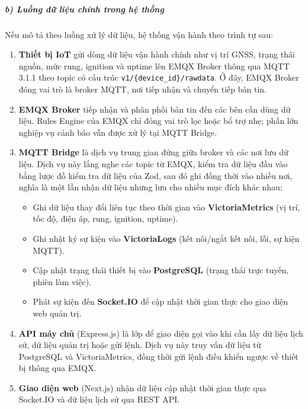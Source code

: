 \documentclass[a4paper]{extarticle}
\providecommand{\tightlist}{%
  \setlength{\itemsep}{0pt}\setlength{\parskip}{0pt}}
\begin{document}
\subparagraph{b) Luồng dữ liệu chính trong hệ
thống}\label{b-luux1ed3ng-dux1eef-liux1ec7u-chuxednh-trong-hux1ec7-thux1ed1ng}

Nếu mô tả theo luồng xử lý dữ liệu, hệ thống vận hành theo trình tự sau:

\begin{enumerate}
\def\labelenumi{\arabic{enumi}.}
\tightlist
\item
  \textbf{Thiết bị IoT} gửi dòng dữ liệu vận hành chính như vị trí GNSS,
  trạng thái nguồn, mức rung, ignition và uptime lên EMQX Broker thông
  qua MQTT 3.1.1 theo topic có cấu trúc
  \texttt{v1/\{device\_id\}/rawdata}. Ở đây, EMQX Broker đóng vai trò là
  broker MQTT, nơi tiếp nhận và chuyển tiếp bản tin.
\item
  \textbf{EMQX Broker} tiếp nhận và phân phối bản tin đến các bên cần
  dùng dữ liệu. Rules Engine của EMQX chỉ đóng vai trò lọc hoặc bổ trợ
  nhẹ; phần lớn nghiệp vụ cảnh báo vẫn được xử lý tại MQTT Bridge.
\item
  \textbf{MQTT Bridge} là dịch vụ trung gian đứng giữa broker và các nơi
  lưu dữ liệu. Dịch vụ này lắng nghe các topic từ EMQX, kiểm tra dữ liệu
  đầu vào bằng lược đồ kiểm tra dữ liệu của Zod, sau đó
  ghi đồng thời vào nhiều nơi, nghĩa là một lần nhận dữ liệu nhưng lưu
  cho nhiều mục đích khác nhau:

  \begin{itemize}
  \tightlist
  \item
    Ghi dữ liệu thay đổi liên tục theo thời gian vào
    \textbf{VictoriaMetrics} (vị trí, tốc độ, điện áp, rung, ignition,
    uptime).
  \item
    Ghi nhật ký sự kiện vào \textbf{VictoriaLogs} (kết nối/ngắt kết nối,
    lỗi, sự kiện MQTT).
  \item
    Cập nhật trạng thái thiết bị vào \textbf{PostgreSQL} (trạng thái
    trực tuyến, phiên làm việc).
  \item
    Phát sự kiện đến \textbf{Socket.IO} để cập nhật thời gian thực cho
    giao diện web quản trị.
\end{itemize}
\item
  \textbf{API máy chủ} (Express.js) là lớp để giao diện gọi vào khi cần
  lấy dữ liệu lịch sử, dữ liệu quản trị hoặc gửi lệnh. Dịch vụ này truy
  vấn dữ liệu từ PostgreSQL và VictoriaMetrics, đồng thời gửi lệnh điều
  khiển ngược về thiết bị thông qua EMQX.
\item
  \textbf{Giao diện web} (Next.js) nhận dữ liệu cập nhật thời gian thực qua
  Socket.IO và dữ liệu lịch sử qua REST API.
\end{enumerate}
\end{document}
